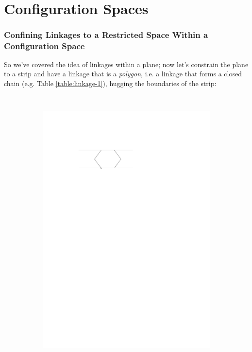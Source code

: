 \section{Configuration Spaces}
\subsubsection{Confining Linkages to a Restricted Space Within a Configuration Space}
So we've covered the idea of linkages within a plane; now let's constrain the plane to a strip and have a linkage that is a \textit{polygon}, i.e. a linkage that forms a closed chain (e.g. Table \ref{table:linkage-1}), hugging the boundaries of the strip:
\begin{figure}[h]
\begin{center}
  ~ %
  \begin{subfigure}[b]{0.49\textwidth}
	  \includegraphics[width=\textwidth]{graphics/hexagonInChannelWithPinnedJointRight.pdf}

\end{subfigure}
\end{center}
\end{figure}

